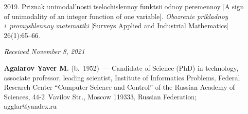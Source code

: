 \begin{multicols}{2}
{{\begin{thebibliography}{9}
   2019. Priznak unimodal'nosti tselochislennoy funktsii odnoy 
peremennoy [A sign of unimodality of an integer function of one variable]. \textit{Obozrenie 
prikladnoy i~promyshlennoy matematiki} [Surveys Applied and Industrial Mathematics]  
26(1):65--66.
\end{thebibliography}

 }
 }

\end{multicols}

\vspace*{-6pt}

\hfill{\small\textit{Received November 8, 2021}}


  
  \Contrl
  
  \noindent
  \textbf{Agalarov Yaver M.} (b.\ 1952)~--- Candidate of Science (PhD) in technology, associate 
professor, leading scientist, Institute of Informatics Problems, Federal Research Center ``Computer 
Science and Control'' of the Russian Academy of Sciences, 44-2~Vavilov Str., Moscow 119333, 
Russian Federation; \mbox{agglar@yandex.ru}
  
  

\label{end\stat}

\renewcommand{\bibname}{\protect\rm Литература} 

   